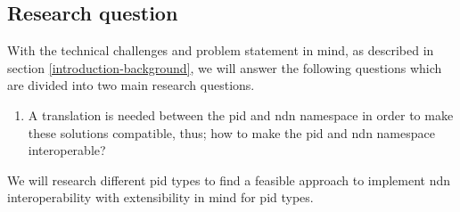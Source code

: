 


\subsection{Research question}
\label{introduction-research-question}
With the technical challenges and problem statement in mind, as described in section \ref{introduction-background}, we will answer the following questions which are divided into two main research questions.

\begin{enumerate}
	\item A translation is needed between the \gls{pid} and \gls{ndn} namespace in order to make these solutions compatible, thus; how to make the \gls{pid} and \gls{ndn} namespace interoperable?
\end{enumerate}

We will research different \gls{pid} types to find a feasible approach to implement \gls{ndn} interoperability with extensibility in mind for \gls{pid} types.

